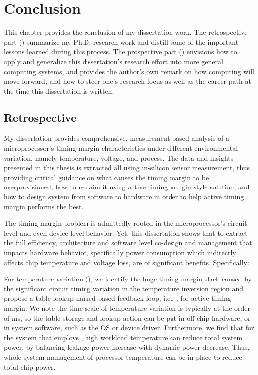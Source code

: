 
\chapter{Conclusion}
\label{sec:conc}

This chapter provides the conclusion of my dissertation work. The retrospective part () summarize my Ph.D. research work and distill some of the important lessons learned during this process. The prospective part () envisions how to apply and generalize this dissertation's research effort into more general computing systems, and provides the author's own remark on how computing will move forward, and how to steer one's research focus as well as the career path at the time this dissertation is written.

\section{Retrospective}
\label{sec:conc:retro}

My dissertation provides comprehensive, measurement-based analysis of a microprocessor's timing margin characteristics under different environmental variation, namely temperature, voltage, and process. The data and insights presented in this thesis is extracted all using in-silicon sensor measurement, thus providing critical guidance on what causes the timing margin to be overprovisioned, how to reclaim it using active timing margin style solution, and how to design system from software to hardware in order to help active timing margin performs the best.

The timing margin problem is admittedly rooted in the microprocessor's circuit level and even device level behavior. Yet, this dissertation shows that to extract the full efficiency, architecture and software level co-design and management that impacts hardware behavior, specifically power consumption which indirectly affects chip temperature and voltage loss, are of significant benefits. Specifically:

For temperature variation (), we identify the huge timing margin slack caused by the significant circuit timing variation in the temperature inversion region and propose a table lookup named based feedback loop, i.e., \tistates, for active timing margin. We note the time scale of temperature variation is typically at the order of ms, so the table storage and lookup action can be put in off-chip hardware, or in system software, such as the OS or device driver. Furthermore, we find that for the system that employs \tistates, high workload temperature can reduce total system power, by balancing leakage power increase with dynamic power decrease. Thus, whole-system management of processor temperature can be in place to reduce total chip power.

